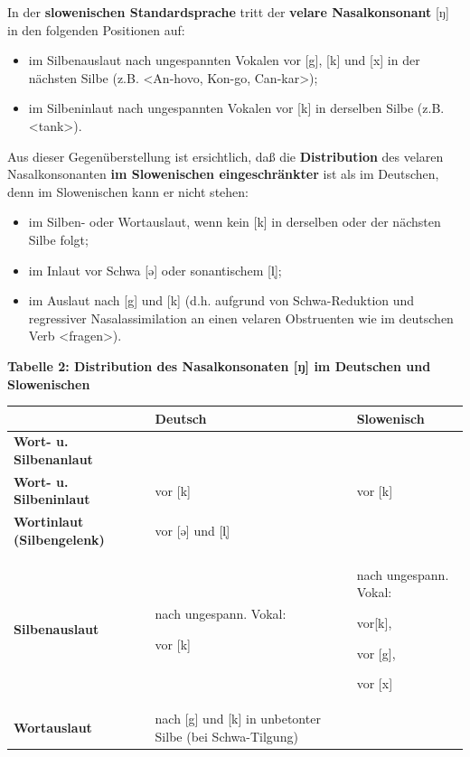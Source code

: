 \documentclass[
]{article}
\begin{document}
In der \textbf{slowenischen Standardsprache} tritt der \textbf{velare
Nasalkonsonant} {[}ŋ{]} in den folgenden Positionen auf:

\begin{itemize}
\item
  im Silbenauslaut nach ungespannten Vokalen vor {[}g{]}, {[}k{]} und {[}x{]} in
  der nächsten Silbe (z.B. \textless An-hovo, Kon-go, Can-kar\textgreater);
\item
  im Silbeninlaut nach ungespannten Vokalen vor {[}k{]} in derselben Silbe
  (z.B. \textless tank\textgreater).
\end{itemize}

Aus dieser Gegenüberstellung ist ersichtlich, daß die \textbf{Distribution}
des velaren Nasalkonsonanten \textbf{im Slowenischen eingeschränkter} ist als
im Deutschen, denn im Slowenischen kann er nicht stehen:

\begin{itemize}
\item
  im Silben- oder Wortauslaut, wenn kein {[}k{]} in derselben oder der
  nächsten Silbe folgt;
\item
  im Inlaut vor Schwa {[}ə{]} oder sonantischem {[}l̩{]};
\item
  im Auslaut nach {[}g{]} und {[}k{]} (d.h. aufgrund von Schwa-Reduktion und
  regressiver Nasalassimilation an einen velaren Obstruenten wie im
  deutschen Verb \textless fragen\textgreater).
\end{itemize}

\textbf{Tabelle 2: Distribution des Nasalkonsonaten {[}ŋ{]} im Deutschen und
Slowenischen}

\begin{longtable}[]{@{}
  >{\raggedright\arraybackslash}p{}
  >{\raggedright\arraybackslash}p{}
  >{\raggedright\arraybackslash}p{}@{}}
\toprule
& \textbf{Deutsch} & \textbf{Slowenisch} \\
\midrule
\endhead
\textbf{Wort- u.
Silbenanlaut} & ~ & ~ \\
\textbf{Wort- u.
Silbeninlaut} & vor {[}k{]} & vor {[}k{]} \\
\textbf{Wortinlaut
(Silbengelenk)} & vor {[}ə{]} und {[}l̩{]} & ~ \\
\textbf{Silbenauslaut} & nach ungespann.
Vokal:

vor {[}k{]} & nach ungespann.
Vokal:

vor{[}k{]},

vor {[}g{]},

vor {[}x{]} \\
\textbf{Wortauslaut} & nach {[}g{]} und {[}k{]} in
unbetonter Silbe
(bei Schwa-Tilgung) & ~ \\
\bottomrule
\end{longtable}
\end{document}
